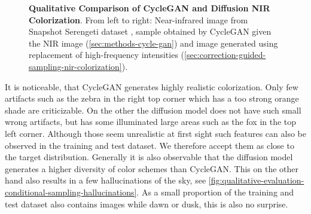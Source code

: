 \begin{figure}
\begin{tabularx}{\textwidth}{Y Y Y !{\space} Y Y Y}
    \end{tabularx}
    \caption{
        \textbf{Qualitative Comparison of CycleGAN and Diffusion NIR Colorization}.
        From left to right:
        Near-infrared image from Snapshot Serengeti dataset \parencite{serengeti},
        sample obtained by CycleGAN given the NIR image (\autoref{sec:methods-cycle-gan}) \parencite{mehri}
        and
        image generated using replacement of high-frequency intensities (\autoref{sec:correction-guided-sampling-nir-colorization}).
    }
    \label{fig:qualitative-evaluation-conditional-sampling}
\end{figure}

It is noticeable, that CycleGAN generates highly realistic colorization.
Only few artifacts such as the zebra in the right top corner which has a too strong orange shade are criticizable.
On the other the diffusion model does not have such small wrong artifacts, but has some illuminated large areas such as the fox in the top left corner.
Although those seem unrealistic at first sight such features can also be observed in the training and test dataset.
We therefore accept them as close to the target distribution.
Generally it is also observable that the diffusion model generates a higher diversity of color schemes than CycleGAN.
This on the other hand also results in a few hallucinations of the sky, see \autoref{fig:qualitative-evaluation-conditional-sampling-hallucinations}.
As a small proportion of the training and test dataset also contains images while dawn or dusk, this is also no surprise.

